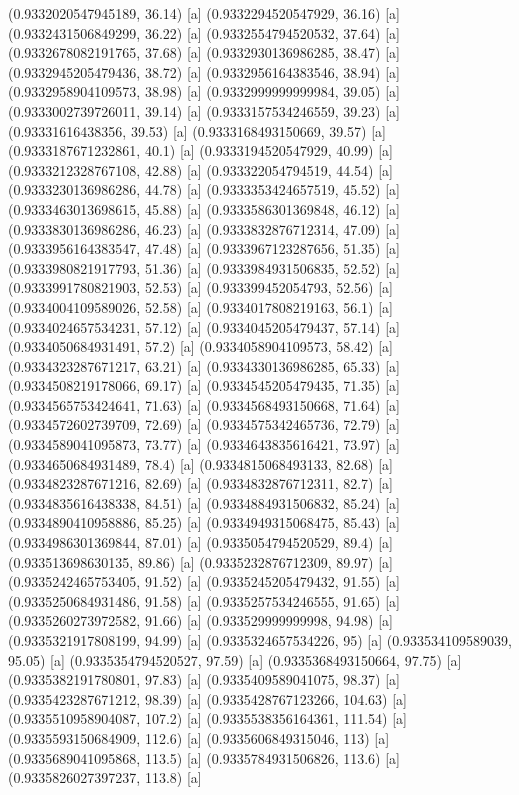 {{{(0.9332020547945189, 36.14) [a] 
(0.9332294520547929, 36.16) [a] 
(0.9332431506849299, 36.22) [a] 
(0.9332554794520532, 37.64) [a] 
(0.9332678082191765, 37.68) [a] 
(0.9332930136986285, 38.47) [a] 
(0.9332945205479436, 38.72) [a] 
(0.9332956164383546, 38.94) [a] 
(0.9332958904109573, 38.98) [a] 
(0.9332999999999984, 39.05) [a] 
(0.9333002739726011, 39.14) [a] 
(0.9333157534246559, 39.23) [a] 
(0.93331616438356, 39.53) [a] 
(0.9333168493150669, 39.57) [a] 
(0.9333187671232861, 40.1) [a] 
(0.9333194520547929, 40.99) [a] 
(0.9333212328767108, 42.88) [a] 
(0.933322054794519, 44.54) [a] 
(0.9333230136986286, 44.78) [a] 
(0.9333353424657519, 45.52) [a] 
(0.9333463013698615, 45.88) [a] 
(0.9333586301369848, 46.12) [a] 
(0.9333830136986286, 46.23) [a] 
(0.9333832876712314, 47.09) [a] 
(0.9333956164383547, 47.48) [a] 
(0.9333967123287656, 51.35) [a] 
(0.9333980821917793, 51.36) [a] 
(0.9333984931506835, 52.52) [a] 
(0.9333991780821903, 52.53) [a] 
(0.933399452054793, 52.56) [a] 
(0.9334004109589026, 52.58) [a] 
(0.9334017808219163, 56.1) [a] 
(0.9334024657534231, 57.12) [a] 
(0.9334045205479437, 57.14) [a] 
(0.9334050684931491, 57.2) [a] 
(0.9334058904109573, 58.42) [a] 
(0.9334323287671217, 63.21) [a] 
(0.9334330136986285, 65.33) [a] 
(0.9334508219178066, 69.17) [a] 
(0.9334545205479435, 71.35) [a] 
(0.9334565753424641, 71.63) [a] 
(0.9334568493150668, 71.64) [a] 
(0.9334572602739709, 72.69) [a] 
(0.9334575342465736, 72.79) [a] 
(0.9334589041095873, 73.77) [a] 
(0.9334643835616421, 73.97) [a] 
(0.9334650684931489, 78.4) [a] 
(0.9334815068493133, 82.68) [a] 
(0.9334823287671216, 82.69) [a] 
(0.9334832876712311, 82.7) [a] 
(0.9334835616438338, 84.51) [a] 
(0.9334884931506832, 85.24) [a] 
(0.9334890410958886, 85.25) [a] 
(0.9334949315068475, 85.43) [a] 
(0.9334986301369844, 87.01) [a] 
(0.9335054794520529, 89.4) [a] 
(0.933513698630135, 89.86) [a] 
(0.9335232876712309, 89.97) [a] 
(0.9335242465753405, 91.52) [a] 
(0.9335245205479432, 91.55) [a] 
(0.9335250684931486, 91.58) [a] 
(0.9335257534246555, 91.65) [a] 
(0.9335260273972582, 91.66) [a] 
(0.933529999999998, 94.98) [a] 
(0.9335321917808199, 94.99) [a] 
(0.9335324657534226, 95) [a] 
(0.933534109589039, 95.05) [a] 
(0.9335354794520527, 97.59) [a] 
(0.9335368493150664, 97.75) [a] 
(0.9335382191780801, 97.83) [a] 
(0.9335409589041075, 98.37) [a] 
(0.9335423287671212, 98.39) [a] 
(0.9335428767123266, 104.63) [a] 
(0.9335510958904087, 107.2) [a] 
(0.9335538356164361, 111.54) [a] 
(0.9335593150684909, 112.6) [a] 
(0.9335606849315046, 113) [a] 
(0.9335689041095868, 113.5) [a] 
(0.9335784931506826, 113.6) [a] 
(0.9335826027397237, 113.8) [a] 
}}}
